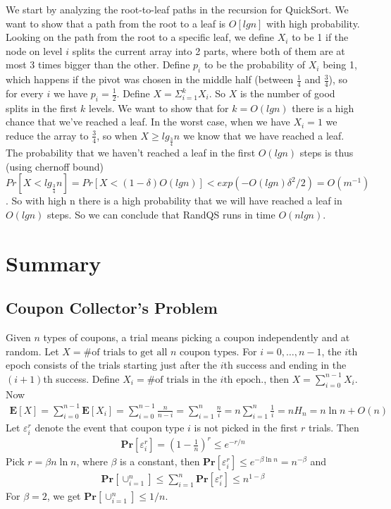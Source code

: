 \documentclass[12pt]{article}
\begin{document}
We start by analyzing the root-to-leaf paths in the recursion for QuickSort. We want to show that a path from the root to a leaf is $O[lgn]$ with high probability.\\
Looking on the path from the root to a specific leaf, we define $X_i$ to be 1 if the node on level $i$ splits the current array into 2 parts, where both of them are at most 3 times bigger than the other. Define $p_i$ to be the probability of $X_i$ being 1, which happens if the pivot was chosen in the middle half (between $\frac{1}{4}$ and $\frac{3}{4}$), so for every $i$ we have $p_i=\frac{1}{2}$. Define $X=\Sigma_{i=1}^kX_i$. So $X$ is the number of good splits in the first $k$ levels. We want to show that for $k=O(lgn)$ there is a high chance that we've reached a leaf. In the worst case, when we have $X_i=1$ we reduce the array to $\frac{3}{4}$, so when $X\geq lg_{\frac{3}{4}}n$ we know that we have reached a leaf. The probability that we haven't reached a leaf in the first $O(lgn)$ steps is thus (using chernoff bound) $Pr[X<lg_{\frac{3}{4}}n]=Pr[X<(1-\delta)O(lgn)]<exp(-O(lgn)\delta^2/2)=O(m^{-1})$.
So with high n there is a high probability that we will have reached a leaf in $O(lgn)$ steps. So we can conclude that RandQS runs in time $O(nlgn)$.

\pagebreak

\section*{Summary}
\subsection*{Coupon Collector's Problem}
Given $n$ types of coupons, a trial means picking a coupon independently and at random. Let $X = \text{\# of trials to get all } n \text{ coupon types}$. For $i=0, \hdots, n-1$, the $i$th epoch consists of the trials starting just after the $i$th success and ending in the $(i+1)$th success. Define $X_i = \text{\# of trials in the } i\text{th epoch.}$, then $X=\sum_{i=0}^{n-1} X_i$. Now
\begin{align*}
\mathbf{E}\left[ X \right] = \sum_{i=0}^{n-1} \mathbf{E}\left[ X_i \right] = \sum_{i=0}^{n-1} \frac{n}{n-i} = \sum_{i=1}^{n} \frac{n}{i} =  n \sum_{i=1}^{n} \frac{1}{i} = n H_{n} = n \ln n + O(n)
\end{align*}
Let $\varepsilon_i^r$ denote the event that coupon type $i$ is not picked in the first $r$ trials. Then
\begin{align*}
\mathbf{Pr}\left[ \varepsilon_i^r \right] = \left(1-\frac{1}{n}\right)^r \leq e^{-r/n}
\end{align*}
Pick $r=\beta n \ln n$, where $\beta$ is a constant, then $\mathbf{Pr}\left[ \varepsilon_i^r \right] \leq e^{-\beta \ln n} = n^{-\beta}$ and
\begin{align*}
\mathbf{Pr}\left[ \cup_{i=1}^n \right] \leq \sum_{i=1}^n \mathbf{Pr}\left[ \varepsilon_i^r \right] \leq n^{1-\beta}
\end{align*}
For $\beta=2$, we get $\mathbf{Pr}\left[ \cup_{i=1}^n \right] \leq 1/n$.
\end{document}
